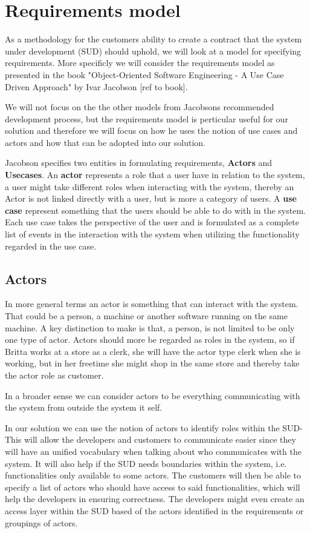 \section{Requirements model}

As a methodology for the customers ability to create a contract that the system under development (SUD) should uphold, we will look at a model for specifying requirements.
More specificly we will consider the requirements model as presented in the book "Object-Oriented Software Engineering - A Use Case Driven Approach" by Ivar Jacobson [ref to book].

We will not focus on the the other models from Jacobsons recommended development process, but the requirements model is perticular useful for our solution and therefore we will focus on how he uses the notion of use cases and actors and how that can be adopted into our solution.

Jacobson specifies two entities in formulating requirements, \textbf{Actors} and \textbf{Usecases}.
An \textbf{actor} represents a role that a user have in relation to the system, a user might take different roles when interacting with the system, thereby an Actor is not linked directly with a user, but is more a category of users.
A \textbf{use case} represent something that the users should be able to do with in the system. Each use case takes the perspective of the user and is formulated as a complete list of events in the interaction with the system when utilizing the functionality regarded in the use case.

\subsection{Actors}
In more general terms an actor is something that can interact with the system. That could be a person, a machine or another software running on the same machine. 
A key distinction to make is that, a person, is not limited to be only one type of actor.
Actors should more be regarded as roles in the system, so if Britta works at a store as a clerk, she will have the actor type clerk when she is working, but in her freetime she might shop in the same store and thereby take the actor role as customer. 

In a broader sense we can consider actors to be everything communicating with the system from outside the system it self.

In our solution we can use the notion of actors to identify roles within the SUD- 
This will allow the developers and customers to communicate easier since they will have an unified vocabulary when talking about who communicates with the system. 
It will also help if the SUD needs boundaries within the system, i.e. functionalities only available to some actors.
The customers will then be able to specify a list of actors who should have access to said functionalities, which will help the developers in ensuring correctness.
The developers might even create an access layer within the SUD based of the actors identified in the requirements or groupings of actors.

